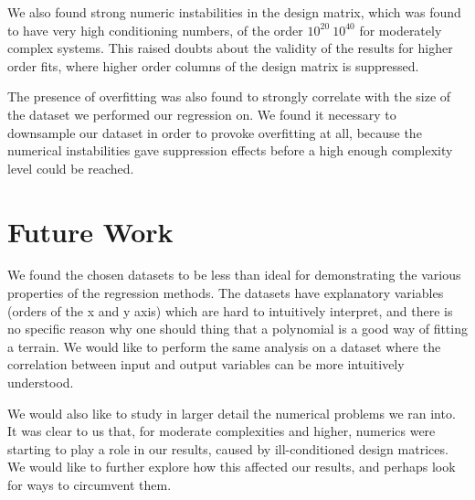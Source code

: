 \documentclass[10pt, twocolumn]{article}
\begin{document}
We also found strong numeric instabilities in the design matrix, which was found to have very high conditioning numbers, of the order $10^{20}~10^{40}$ for moderately complex systems. This raised doubts about the validity of the results for higher order fits, where higher order columns of the design matrix is suppressed.

The presence of overfitting was also found to strongly correlate with the size of the dataset we performed our regression on. We found it necessary to downsample our dataset in order to provoke overfitting at all, because the numerical instabilities gave suppression effects before a high enough complexity level could be reached.

\section{Future Work}
We found the chosen datasets to be less than ideal for demonstrating the various properties of the regression methods. The datasets have explanatory variables (orders of the x and y axis) which are hard to intuitively interpret, and there is no specific reason why one should thing that a polynomial is a good way of fitting a terrain. We would like to perform the same analysis on a dataset where the correlation between input and output variables can be more intuitively understood.

We would also like to study in larger detail the numerical problems we ran into. It was clear to us that, for moderate complexities and higher, numerics were starting to play a role in our results, caused by ill-conditioned design matrices. We would like to further explore how this affected our results, and perhaps look for ways to circumvent them.
\end{document}
